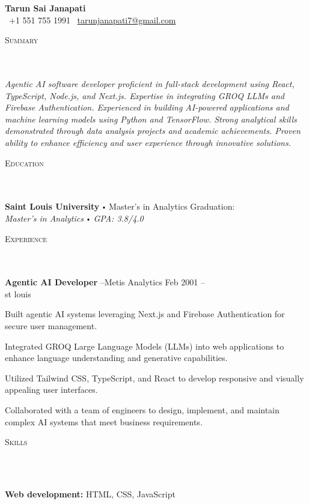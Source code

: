 \documentclass{article}
\newcommand{\school}[4]{
  \textbf{#1} \labelitemi #2 \hfill #3 \\ #4 \vspace*{5pt}
}
\newcommand{\employer}[4]{{
  \vspace*{2pt}%
  \textbf{#1} #2 \hfill #3\\ #4 \vspace*{2pt}}
}
\newcommand{\lineunder}{
  \vspace*{-8pt} \\ \hspace*{-18pt} 
  \hrulefill \\
}
\newcommand{\header}[1]{{
  \hspace*{-15pt}\vspace*{6pt} \textsc{#1}} \vspace*{-6pt} 
  \lineunder
}
\renewcommand{\labelitemi}{
  $\vcenter{\hbox{\tiny$\bullet$}}$\hspace*{3pt}
}
\renewcommand{\labelitemii}{
  $\vcenter{\hbox{\tiny$\bullet$}}$\hspace*{-3pt}
}
\newenvironment{bullet-list-major}{
  \begin{list}{\labelitemii}{\setlength\leftmargin{3pt} 
  \topsep 0pt \itemsep -2pt}}{\vspace*{4pt}\end{list}
}
\newenvironment{bullet-list-minor}{
  \begin{list}{\labelitemii}{\setlength\leftmargin{15pt} 
  \topsep 0pt \itemsep -2pt}}{\vspace*{4pt}\end{list}
}
\begin{document}
\small
\smallskip
\vspace*{-44pt}
\begin{center}
  {\LARGE \textbf{Tarun Sai Janapati}} \\
  \faPhone\ +1 551 755 1991 \quad
  \faEnvelope\ \href{mailto:tarunjanapati7@gmail.com}{tarunjanapati7@gmail.com} \quad
  
  
  
\end{center}

  \header{Summary}
  \textit{Agentic AI software developer proficient in full-stack development using React, TypeScript, Node.js, and Next.js. Expertise in integrating GROQ LLMs and Firebase Authentication. Experienced in building AI-powered applications and machine learning models using Python and TensorFlow. Strong analytical skills demonstrated through data analysis projects and academic achievements. Proven ability to enhance efficiency and user experience through innovative solutions.}


  \header{Education}
  
      \school{Saint Louis University}{Master's in Analytics}{
        Graduation: 
      }{\textit{Master's in Analytics \labelitemi GPA: 3.8/4.0}}
    


  \header{Experience}
  
      \employer{Agentic AI Developer}{--Metis Analytics}{
        Feb 2001 -- 
      }{st louis}
      
        \begin{bullet-list-minor}
          \item Built agentic AI systems leveraging Next.js and Firebase Authentication for secure user management.
\item Integrated GROQ Large Language Models (LLMs) into web applications to enhance language understanding and generative capabilities.
\item Utilized Tailwind CSS, TypeScript, and React to develop responsive and visually appealing user interfaces.
\item Collaborated with a team of engineers to design, implement, and maintain complex AI systems that meet business requirements.
        \end{bullet-list-minor}
      
    


  \header{Skills}
  
    \begin{bullet-list-major}
      \item \textbf{Web development:} HTML, CSS, JavaScript
    \end{bullet-list-major}
  
\end{document}
